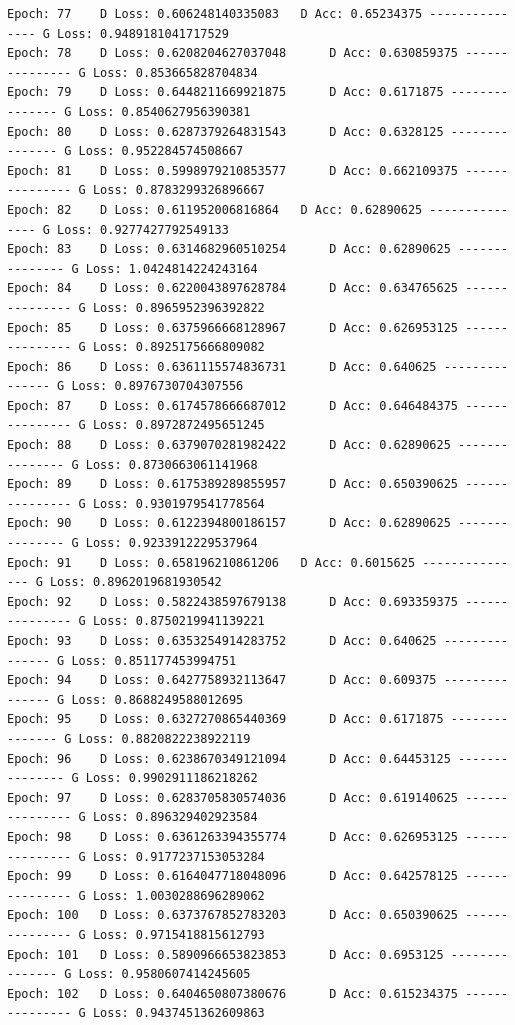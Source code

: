 \documentclass[11pt]{article}
\begin{document}
\begin{Verbatim}[commandchars=\\\{\}]
Epoch: 77 	 D Loss: 0.606248140335083 	 D Acc: 0.65234375 --------------- G Loss: 0.9489181041717529
Epoch: 78 	 D Loss: 0.6208204627037048 	 D Acc: 0.630859375 --------------- G Loss: 0.853665828704834
Epoch: 79 	 D Loss: 0.6448211669921875 	 D Acc: 0.6171875 --------------- G Loss: 0.8540627956390381
Epoch: 80 	 D Loss: 0.6287379264831543 	 D Acc: 0.6328125 --------------- G Loss: 0.952284574508667
Epoch: 81 	 D Loss: 0.5998979210853577 	 D Acc: 0.662109375 --------------- G Loss: 0.8783299326896667
Epoch: 82 	 D Loss: 0.611952006816864 	 D Acc: 0.62890625 --------------- G Loss: 0.9277427792549133
Epoch: 83 	 D Loss: 0.6314682960510254 	 D Acc: 0.62890625 --------------- G Loss: 1.0424814224243164
Epoch: 84 	 D Loss: 0.6220043897628784 	 D Acc: 0.634765625 --------------- G Loss: 0.8965952396392822
Epoch: 85 	 D Loss: 0.6375966668128967 	 D Acc: 0.626953125 --------------- G Loss: 0.8925175666809082
Epoch: 86 	 D Loss: 0.6361115574836731 	 D Acc: 0.640625 --------------- G Loss: 0.8976730704307556
Epoch: 87 	 D Loss: 0.6174578666687012 	 D Acc: 0.646484375 --------------- G Loss: 0.8972872495651245
Epoch: 88 	 D Loss: 0.6379070281982422 	 D Acc: 0.62890625 --------------- G Loss: 0.8730663061141968
Epoch: 89 	 D Loss: 0.6175389289855957 	 D Acc: 0.650390625 --------------- G Loss: 0.9301979541778564
Epoch: 90 	 D Loss: 0.6122394800186157 	 D Acc: 0.62890625 --------------- G Loss: 0.9233912229537964
Epoch: 91 	 D Loss: 0.658196210861206 	 D Acc: 0.6015625 --------------- G Loss: 0.8962019681930542
Epoch: 92 	 D Loss: 0.5822438597679138 	 D Acc: 0.693359375 --------------- G Loss: 0.8750219941139221
Epoch: 93 	 D Loss: 0.6353254914283752 	 D Acc: 0.640625 --------------- G Loss: 0.851177453994751
Epoch: 94 	 D Loss: 0.6427758932113647 	 D Acc: 0.609375 --------------- G Loss: 0.8688249588012695
Epoch: 95 	 D Loss: 0.6327270865440369 	 D Acc: 0.6171875 --------------- G Loss: 0.8820822238922119
Epoch: 96 	 D Loss: 0.6238670349121094 	 D Acc: 0.64453125 --------------- G Loss: 0.9902911186218262
Epoch: 97 	 D Loss: 0.6283705830574036 	 D Acc: 0.619140625 --------------- G Loss: 0.896329402923584
Epoch: 98 	 D Loss: 0.6361263394355774 	 D Acc: 0.626953125 --------------- G Loss: 0.9177237153053284
Epoch: 99 	 D Loss: 0.6164047718048096 	 D Acc: 0.642578125 --------------- G Loss: 1.0030288696289062
Epoch: 100 	 D Loss: 0.6373767852783203 	 D Acc: 0.650390625 --------------- G Loss: 0.9715418815612793
Epoch: 101 	 D Loss: 0.5890966653823853 	 D Acc: 0.6953125 --------------- G Loss: 0.9580607414245605
Epoch: 102 	 D Loss: 0.6404650807380676 	 D Acc: 0.615234375 --------------- G Loss: 0.9437451362609863

\end{Verbatim}
\end{document}
